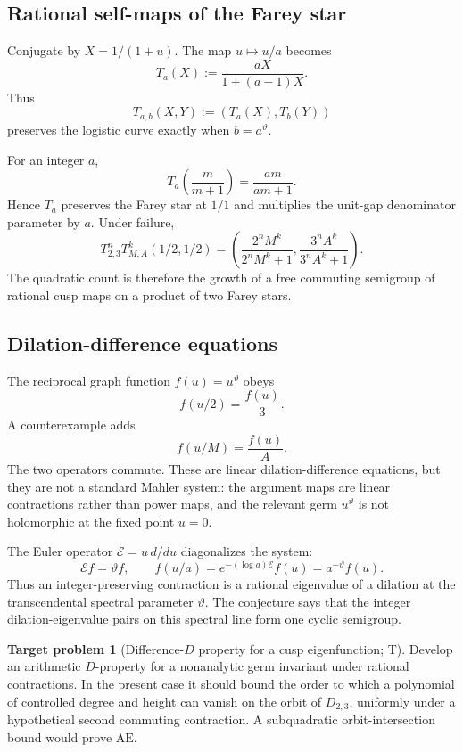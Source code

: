 \documentclass[10pt,oneside]{article}
\theoremstyle{definition}
\newtheorem{problem}[theorem]{Target problem}
\theoremstyle{remark}
\newcommand{\thetaq}{\vartheta}
\newcommand{\AEconj}{\mathrm{AE}}
\newcommand{\statusT}{\textsc{T}}
\begin{document}
\subsection{Rational self-maps of the Farey star}
Conjugate by \(X=1/(1+u)\).  The map \(u\mapsto u/a\) becomes
\begin{equation}
 T_a(X):=\frac{aX}{1+(a-1)X}.
\label{eq:farey-map}
\end{equation}
Thus
\[
 T_{a,b}(X,Y):=(T_a(X),T_b(Y))
\]
preserves the logistic curve exactly when \(b=a^{\thetaq}\).

For an integer \(a\),
\[
 T_a\!\left(\frac m{m+1}\right)=\frac{am}{am+1}.
\]
Hence \(T_a\) preserves the Farey star at \(1/1\) and multiplies the unit-gap denominator parameter by \(a\).  Under failure,
\begin{equation}
 T_{2,3}^nT_{M,A}^k(1/2,1/2)
 =\left(
 \frac{2^nM^k}{2^nM^k+1},
 \frac{3^nA^k}{3^nA^k+1}
 \right).
\label{eq:farey-orbit}
\end{equation}
The quadratic count is therefore the growth of a free commuting semigroup of rational cusp maps on a product of two Farey stars.

\subsection{Dilation-difference equations}
The reciprocal graph function \(f(u)=u^{\thetaq}\) obeys
\begin{equation}
 f(u/2)=\frac{f(u)}3.
\label{eq:natural-difference}
\end{equation}
A counterexample adds
\begin{equation}
 f(u/M)=\frac{f(u)}A.
\label{eq:hypothetical-difference}
\end{equation}
The two operators commute.  These are linear dilation-difference equations, but they are not a standard Mahler system: the argument maps are linear contractions rather than power maps, and the relevant germ \(u^{\thetaq}\) is not holomorphic at the fixed point \(u=0\).

The Euler operator \(\mathcal E=u\,d/du\) diagonalizes the system:
\[
 \mathcal E f=\thetaq f,
 \qquad
 f(u/a)=e^{-(\log a)\mathcal E}f(u)=a^{-\thetaq}f(u).
\]
Thus an integer-preserving contraction is a rational eigenvalue of a dilation at the transcendental spectral parameter \(\thetaq\).  The conjecture says that the integer dilation-eigenvalue pairs on this spectral line form one cyclic semigroup.

\begin{problem}[Difference-\(D\) property for a cusp eigenfunction; \statusT]
\label{prob:difference-D}
Develop an arithmetic \(D\)-property for a nonanalytic germ invariant under rational contractions.  In the present case it should bound the order to which a polynomial of controlled degree and height can vanish on the orbit of \(D_{2,3}\), uniformly under a hypothetical second commuting contraction.  A subquadratic orbit-intersection bound would prove \(\AEconj\).
\end{problem}
\end{document}
